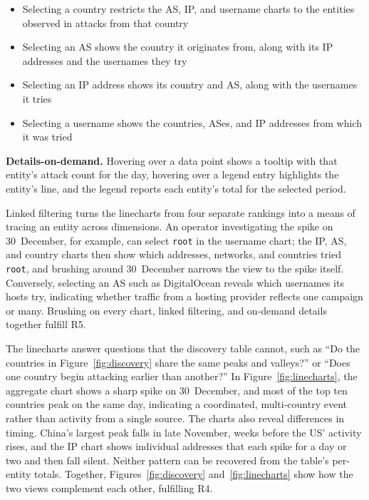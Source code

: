 \documentclass[10pt,twocolumn]{article}   %
\begin{document}
\begin{itemize}
  \item Selecting a country restricts the AS, IP, and username charts to the entities observed in attacks from that country
  \item Selecting an AS shows the country it originates from, along with its IP addresses and the usernames they try
  \item Selecting an IP address shows its country and AS, along with the usernames it tries
  \item Selecting a username shows the countries, ASes, and IP addresses from which it was tried
\end{itemize}

 
\textbf{Details-on-demand.} Hovering over a data point shows a tooltip with that entity's attack count for the day, hovering over a legend entry highlights the entity's line, 
and the legend reports each entity's total for the selected period.
 
Linked filtering turns the linecharts from four separate rankings into a means of tracing an entity across dimensions. An operator investigating the spike on 30~December, 
for example, can select \texttt{root} in the username chart; the IP, AS, and country charts then show which addresses, networks, and countries tried \texttt{root}, and 
brushing around 30~December narrows the view to the spike itself. Conversely, selecting an AS such as DigitalOcean reveals which usernames its hosts try, indicating 
whether traffic from a hosting provider reflects one campaign or many. Brushing on every chart, linked filtering, and on-demand details together fulfill R5.




 
The linecharts answer questions that the discovery table cannot, such as ``Do the countries in Figure~\ref{fig:discovery} share the same peaks and valleys?'' or ``Does one country 
begin attacking earlier than another?'' In Figure~\ref{fig:linecharts}, the aggregate chart shows a sharp spike on 30~December, and most of the top ten countries peak on the same 
day, indicating a coordinated, multi-country event rather than activity from a single source. The charts also reveal differences in timing. China's largest peak falls in late 
November, weeks before the US' activity rises, and the IP chart shows individual addresses that each spike for a day or two and then fall silent. Neither pattern can 
be recovered from the table's per-entity totals. Together, Figures~\ref{fig:discovery} and~\ref{fig:linecharts} show how the two views complement each other, fulfilling R4.
\end{document}
